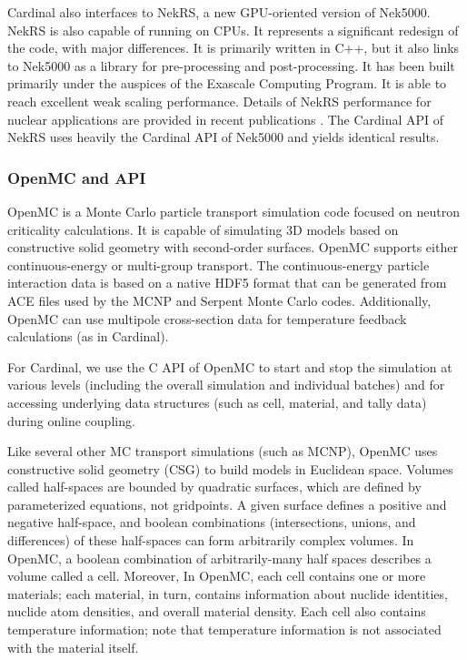 Cardinal also interfaces to NekRS, a new GPU-oriented version of Nek5000. NekRS is also capable of running on CPUs. It represents a significant redesign of the code, with major differences. It is primarily written in C++, but it also links to Nek5000 as a library for pre-processing and post-processing. It has been built primarily under the auspices of the Exascale Computing Program. It is able to reach excellent weak scaling performance. Details of NekRS performance for nuclear applications are provided in recent publications \cite{merzari2020toward}. The Cardinal API of NekRS uses heavily the Cardinal API of Nek5000 and yields identical results.


\subsubsection{OpenMC and API}

OpenMC \cite{romano2013openmc} is a Monte Carlo particle transport simulation code focused on neutron criticality calculations. It is
capable of simulating 3D models based on constructive solid geometry with second-order surfaces. OpenMC
supports either continuous-energy or multi-group transport. The continuous-energy particle interaction data
is based on a native HDF5 format that can be generated from ACE files used by the MCNP and Serpent
Monte Carlo codes. Additionally, OpenMC can use multipole cross-section data for temperature feedback
calculations (as in Cardinal).

For Cardinal, we use the C API of OpenMC to start and stop the simulation at various levels (including the overall
simulation and individual batches) and for accessing underlying data structures (such as cell, material, and
tally data) during online coupling.

Like several other MC transport simulations (such as MCNP), OpenMC uses constructive solid geometry (CSG) to build models in Euclidean space.
Volumes called half-spaces are bounded by quadratic surfaces, which are defined by parameterized equations, not gridpoints. A given surface defines a positive and negative half-space, and boolean combinations (intersections, unions, and differences) of these half-spaces can form arbitrarily complex volumes. In OpenMC, a boolean combination of arbitrarily-many half spaces describes a volume called a cell. Moreover, In OpenMC, each cell contains one or more materials; each material, in turn, contains information about nuclide identities, nuclide atom densities, and overall material density. Each cell also contains temperature information; note that temperature information is not associated with the material itself.

